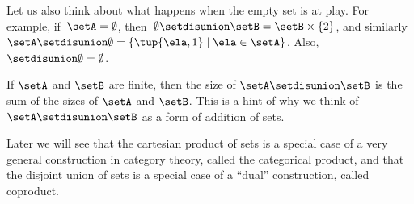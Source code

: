 Let us also think about what happens when the empty set is at play. For example, if~$\setA = \emptyset$, then~$\emptyset \setdisunion \setB = \setB \times \{2\}$, and similarly~$\setA \setdisunion \emptyset =  \{ \tup{\ela,1} \mid \ela \in \setA \}$. Also, $\empty \setdisunion \emptyset = \emptyset$.  

\begin{remark}
If $\setA$ and $\setB$ are finite, then the size of $\setA \setdisunion \setB$ is the sum of the sizes of $\setA$ and $\setB$. This is a hint of why we think of $\setA \setdisunion \setB$ as a form of addition of sets. 
\end{remark}

Later we will see that the cartesian product of sets is a special case of a very general construction in category theory, called the categorical product, and that the disjoint union of sets is a special case of a ``dual'' construction, called coproduct.



